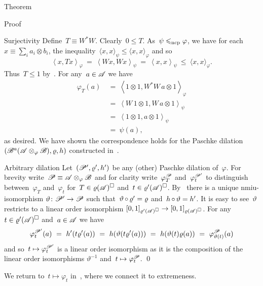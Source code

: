 \documentclass[b]{subfiles}
\begin{document}
\begin{parsec}
\begin{point}{Theorem}
\begin{point}{Proof}
\begin{point}{Surjectivity}
Define~$T \equiv W^*W$. Clearly~$0\leq T$.
As~$\psi \mathrel{\leqslant_{\mathrm{ncp}}} \varphi$,
    we have for each~$x \equiv \sum_i a_i \otimes b_i$,
    the inequality~$\langle x,x\rangle_\psi \leq \langle x,x\rangle_\varphi$
    and so
\begin{equation*}
    \left<x, Tx\right>_\varphi \ =\  \left<Wx,Wx\right>_\psi
    \ =\  \left<x,x\right>_\psi \ \leq\  \langle x,x \rangle_\varphi.
\end{equation*}
    Thus~$T \leq 1$ by~.
For any~$a\in \mathscr{A}$ we have
\begin{align*}
    \varphi_T(a) &\ =\  \left<1\otimes 1, W^*W\, a \otimes 1\right>_\varphi \\
    &  \ =\  \left<W\, 1\otimes 1, W\, a\otimes1\right>_\psi \\
    &  \ = \ \left<1\otimes1, a\otimes1\right>_\psi \\
    &  \ = \ \psi(a),
\end{align*}
    as desired.  We have shown the correspondence holds for
    the Paschke dilation~$(\mathscr{B}^a(\mathscr{A} \otimes_\varphi \mathscr{B}), \varrho, h)$
                constructed in~.
\end{point}
\begin{point}{Arbitrary dilation}%
Let~$(\mathscr{P}', \varrho', h')$ be any (other) Paschke dilation
    of~$\varphi$.
For brevity write~$\mathscr{P} \equiv \mathscr{A} \otimes_\varphi \mathscr{B}$
    and for clarity
    write~$\varphi_T^{\mathscr{P}}$
        and~$\varphi_t^{\mathscr{P}'}$
    to distinguish between~$\varphi_T$ and~$\varphi_t$
    for~$T \in \varrho(\mathscr{A})^\square$ and~$t \in \varrho'(\mathscr{A})^\square$.
By~
    there is a unique nmiu-isomorphism
    $\vartheta\colon \mathscr{P}' \to \mathscr{P}$
    such that~$\vartheta \mathop{\circ} \varrho' = \varrho $
    and~$h \mathop{\circ} \vartheta = h'$.
It is easy to see~$\vartheta$ restricts to a linear order isomorphism
    $[0,1]_{\varrho'(\mathscr{A})^\square} \to [0,1]_{\varrho(\mathscr{A})^\square}$.
For any~$t \in \varrho'(\mathscr{A})^\square$ and~$a\in \mathscr{A}$ we have
\begin{equation*}
    \varphi_t^{\mathscr{P}'} (a)
        \ = \ h'(t \varrho'(a))
        \ = \ h(\vartheta(t \varrho'(a)))
        \ = \ h(\vartheta(t) \varrho(a))
        \ = \ \varphi_{\vartheta(t)}^{\mathscr{P}}(a)
\end{equation*}
and so~$t \mapsto \varphi_t^{\mathscr{P}'}$
    is a linear order isomorphism as it
    is the composition of the linear order isomorphisms
    $\vartheta^{-1}$ and~$t \mapsto \varphi_t^{\mathscr{P}}$. \qed
\end{point}
\begin{point}%
We return to~$t \mapsto \varphi_t$
    in~,
    where we connect it to extremeness.
\end{point}
\end{point}
\end{point}
\end{parsec}
\end{document}
